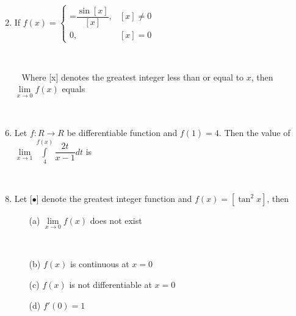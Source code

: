 \begin{enumerate}[label=\arabic*.,ref=\thesubsection.\theenumi]
\item[~] \item If $f(x)=\begin{cases}\mathbin{=}\dfrac{\sin[x]}{[x]}, & \text{$[x]\neq 0$} \\
0, & \text{$[x]=0$} \end{cases}$\item[~] \item[~]
Where [x] denotes the greatest integer less than or equal to $x$, then $\lim\limits_{x \to 0}f(x)$ equals
\begin{itemize}
\end{itemize}

\item[~] \item Let $f:R\to R$ be differentiable function and $f(1)=4$. Then the value of $\lim\limits_{x \to 1}\int\limits_4^{f(x)}\dfrac{2t}{x-1} dt$ is
\begin{itemize}
\end{itemize}

\item[~] \item Let [$\bullet$] denote the greatest integer function and $f(x)=[\tan^2x]$, then
\begin{itemize}
\item[(a)] $\lim\limits_{x \to 0}f(x)$ does not exist \item[~]
\item[(b)] $f(x)$ is continuous at $x=0$
\item[(c)] $f(x)$ is not differentiable at $x=0$
\item[(d)] $f'(0)=1$
\end{itemize}


\end{enumerate}
